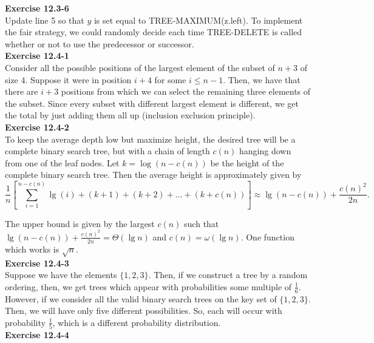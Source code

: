 \documentclass{article}
\begin{document}
\noindent\textbf{Exercise 12.3-6}\\

Update line 5 so that $y$ is set equal to TREE-MAXIMUM(z.left). To implement the fair strategy, we could randomly decide each time TREE-DELETE is called whether or not to use the predecessor or successor. \\

\noindent\textbf{ Exercise 12.4-1} \\

Consider all the possible positions of the largest element of the subset of $n+3$ of size 4. Suppose it were in position $i+4$ for some $i\le n-1$. Then, we have that there are $i+3$ positions from which we can select the remaining three elements of the subset. Since every subset with different largest element is different, we get the total by just adding them all up (inclusion exclusion principle).\\

\noindent\textbf{Exercise 12.4-2}\\

To keep the average depth low but maximize height, the desired tree will be a complete binary search tree, but with a chain of length $c(n)$ hanging down from one of the leaf nodes. Let $k = \log(n-c(n))$ be the height of the complete binary search tree.  Then the average height is approximately given by 
\[ \frac{1}{n}\left[ \sum_{i=1}^{n - c(n)}\lg(i) + (k+1) + (k+2) + \ldots + (k+c(n))\right] \approx  \lg(n-c(n)) + \frac{c(n)^2}{2n}. \]

The upper bound is given by the largest $c(n)$ such that $\lg(n-c(n)) + \frac{c(n)^2}{2n} = \Theta(\lg n)$ and $c(n) = \omega(\lg n)$.  One function which works is $\sqrt{n}$.\\

\noindent\textbf{ Exercise 12.4-3} \\

Suppose we have the elements $\{1,2,3\}$. Then, if we construct a tree by a random ordering, then, we get trees which appear with probabilities some multiple of $\frac{1}{6}$. However, if we consider all the valid binary search trees on the key set of $\{1,2,3\}$. Then, we will have only five different possibilities. So, each will occur with probability $\frac{1}{5}$, which is a different probability distribution.\\

\noindent\textbf{Exercise 12.4-4}\\
\end{document}
